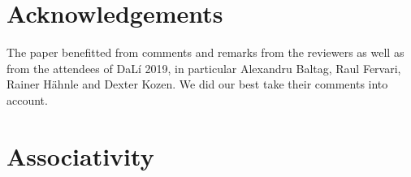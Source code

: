 \documentclass{llncs}
\begin{document}
\section{Acknowledgements}
The paper benefitted from comments and remarks from the reviewers as well as from the attendees of DaL\'i 2019, 
in particular Alexandru Baltag, Raul Fervari, Rainer H\"ahnle and Dexter Kozen. 
We did our best take their comments into account. 


\appendix
\section{Associativity}


%


\end{document}
